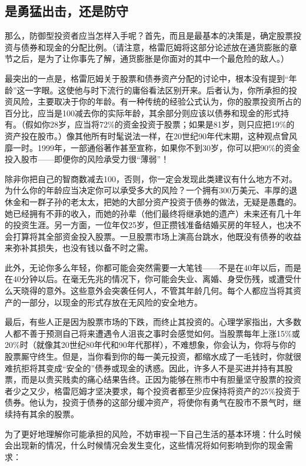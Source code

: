 \documentclass[12pt,oneside]{book}
\begin{document}
\subsection{是勇猛出击，还是防守}
那么，防御型投资者应当怎样入手呢？首先，而且是最基本的决策是，确定股票投资与债券和现金的分配比例。（请注意，格雷厄姆将这部分论述放在通货膨胀的章节之后，是为了让你事先了解，通货膨胀是你面对的其中一个最危险的敌人。）

最突出的一点是，格雷厄姆关于股票和债券资产分配的讨论中，根本没有提到“年龄”这一字眼。这使他与时下流行的庸俗看法区别开来。后者认为，你所承担的投资风险，主要取决于你的年龄。有一种传统的经验公式认为，你的股票投资所占的百分比，应当是100减去你的实际年龄，其余部分则应该以债券和现金的形式持有。（假如你28岁，应当将72\%的资金投资于股票；如果是81岁，则只应把19\%的资产投在股市。）像其他所有时髦说法一样，在20世纪90年代末期，这种观点曾风靡一时。1999年，一部通俗著作甚至宣称，如果你不到30岁，你可以把90\%的资金投入股市——即便你的风险承受力很“薄弱”！

除非你把自己的智商数减去100，否则，你一定会发现此类建议有什么地方不对。为什么你的年龄应当决定你可以承受多大的风险？一个拥有300万美元、丰厚的退休金和一群子孙的老太太，把她的大部分资产投资于债券的做法，无疑是愚蠢的。她已经拥有不菲的收入，而她的孙辈（他们最终将继承她的遗产）未来还有几十年的投资生涯。另一方面，一位年仅25岁，但正攒钱准备结婚买房的年轻人，也决不会打算将其全部资金投入股票。一旦股票市场上演高台跳水，他既没有债券的收益来弥补其损失，也没有钱以备不时之需。

此外，无论你多么年轻，你都可能会突然需要一大笔钱——不是在40年以后，而是在40分钟以后。在毫无先兆的情况下，你可能会失业、离婚、身受伤残，或遭受什么天晓得的意外。这些意外会突袭任何人，不管其年龄几何。每个人都应当将其资产的一部分，以现金的形式存放在无风险的安全地方。

最后，有些人正是因为股票市场的下跌，而终止其投资的。心理学家指出，大多数人都不善于预测自己将来遭遇令人沮丧之事时会感觉如何。当股票每年上涨15\%或20\%时（就像其20世纪80年代和90年代那样），不难想象，你会认为，你将与你的股票厮守终生。但是，当你看到你的每一美元投资，都缩水成了一毛钱时，你就很难抗拒将其变成“安全的”债券或现金的诱惑。因此，许多人不是买进并持有其股票，而是以贵买贱卖的痛心结果告终。正因为能够在熊市中有胆量坚守股票的投资者少之又少，格雷厄姆才坚决要求，每个投资者都至少应保持将资产的25\%投资于债券。他认为，投资于债券的这部分缓冲资产，将使你有勇气在股市不景气时，继续持有其余的股票。

为了更好地理解你可能承担的风险，不妨审视一下自己生活的基本环境：什么时候会出现新的情况，什么时候情况会发生变化，这些情况将如何影响到你的现金需求：
\end{document}
